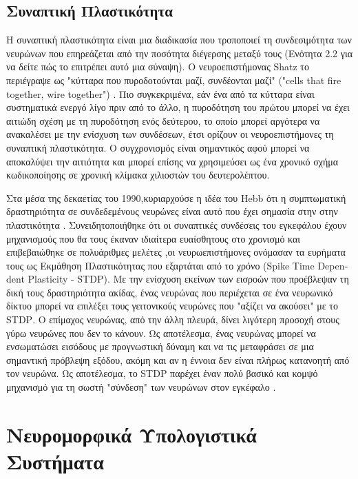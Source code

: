 \documentclass[12pt]{report}
\begin{document}
\section{Συναπτική Πλαστικότητα}
Η συναπτική πλαστικότητα είναι μια διαδικασία που τροποποιεί τη συνδεσιμότητα των νευρώνων που επηρεάζεται από την ποσότητα διέγερσης μεταξύ τους (Ενότητα 2.2 για να δείτε πώς το επιτρέπει αυτό μια σύναψη). Ο νευροεπιστήμονας \textlatin{Shatz} το περιέγραψε ως "κύτταρα που πυροδοτούνται μαζί, συνδέονται μαζί"  (\textlatin{"cells that fire together, wire together"}) \cite{shatz1992}. Πιο συγκεκριμένα, εάν ένα από τα κύτταρα είναι συστηματικά ενεργό λίγο πριν από το άλλο, η πυροδότηση του πρώτου μπορεί να έχει αιτιώδη σχέση με τη πυροδότηση ενός δεύτερου, το οποίο μπορεί αργότερα να ανακαλέσει με την ενίσχυση των συνδέσεων, έτσι ορίζουν οι νευροεπιστήμονες τη συναπτική πλαστικότητα. Ο συγχρονισμός είναι σημαντικός αφού μπορεί να αποκαλύψει την αιτιότητα και μπορεί επίσης να χρησιμεύσει ως ένα χρονικό σχήμα κωδικοποίησης σε χρονική κλίμακα χιλιοστών του δευτερολέπτου.

Στα μέσα της δεκαετίας του 1990,κυριαρχούσε η ιδέα του \textlatin{Hebb} ότι η συμπτωματική δραστηριότητα σε συνδεδεμένους νευρώνες είναι αυτό που έχει σημασία στην στην πλαστικότητα . Συνειδητοποιήθηκε ότι οι συναπτικές συνδέσεις του εγκεφάλου έχουν μηχανισμούς που θα τους έκαναν ιδιαίτερα ευαίσθητους στο χρονισμό και επιβεβαιώθηκε σε πολυάριθμες μελέτες  \cite{markram1995}\cite{markram1997}\cite{Gerstner1996} ,οι νευρωεπιστήμονες ονόμασαν τα ευρήματα τους ως Εκμάθηση Πλαστικότητας που εξαρτάται από το χρόνο (\textlatin{Spike Time Dependent Plasticity -  STDP}). Με την ενίσχυση εκείνων των εισροών που προέβλεψαν τη δική τους δραστηριότητα ακίδας, ένας νευρώνας που περιέχεται σε ένα νευρωνικό δίκτυο μπορεί να επιλέξει τους γειτονικούς νευρώνες που "αξίζει να ακούσει" με το \textlatin{STDP}. Ο επίμαχος νευρώνας, από την άλλη πλευρά, δίνει λιγότερη προσοχή στους γύρω νευρώνες που δεν το κάνουν. Ως αποτέλεσμα, ένας νευρώνας μπορεί να ενσωματώσει εισόδους με προγνωστική δύναμη και να τις μεταφράσει σε μια σημαντική πρόβλεψη εξόδου, ακόμη και αν η έννοια δεν είναι πλήρως κατανοητή από τον νευρώνα. Ως αποτέλεσμα, το \textlatin{STDP} παρέχει έναν πολύ βασικό και κομψό μηχανισμό για τη σωστή "σύνδεση" των νευρώνων στον εγκέφαλο \cite{Markram2012}.


\chapter{Νευρομορφικά Υπολογιστικά Συστήματα}
\end{document}
